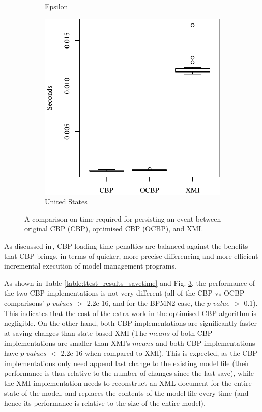 \documentclass{llncs}
\begin{document}
\begin{figure}[ht]
\begin{subfigure}{0.325\textwidth}
    \caption{Epsilon}
    \label{fig:save_time_epsilon}
\end{subfigure}
\hfill
\begin{subfigure}{0.325\textwidth}
    \centering
    \includegraphics[width=\linewidth]{images/save_time_wikipedia}
    \caption{United States}
    \label{fig:save_time_wikipedia}
\end{subfigure}
\caption{A comparison on time required for persisting an event between original CBP (CBP), optimised CBP (OCBP), and XMI.}
\label{fig:savetime}
    \end{figure}
    
   
    As discussed in\,\cite{yohannis2017turning}, CBP loading time penalties are balanced against the benefits that CBP brings, in terms of quicker, more precise differencing and more efficient incremental execution of model management programs.
    
    As shown in Table \ref{table:ttest_results_savetime} and Fig. \ref{fig:savetime}, the performance of the two CBP implementations is not very different (all of the CBP vs OCBP comparisons' $p$-$values$ $>$ 2.2e-16, and for the BPMN2 case, the $p$-$value$ $>$ 0.1). This indicates that the cost of the extra work in the optimised CBP algorithm is negligible. On the other hand, both CBP implementations are significantly faster at saving changes than state-based XMI (The $means$ of both CBP implementations are smaller than XMI's $means$ and both CBP implementations have $p$-$values$ $<$ 2.2e-16 when compared to XMI). This is expected, as the CBP implementations only need append last change to the existing model file (their performance is thus relative to the number of changes since the last save), while the XMI implementation needs to reconstruct an XML document for the entire state of the model, and replaces the contents of the model file every time (and hence its performance is relative to the size of the entire model). 
    
\end{document}
